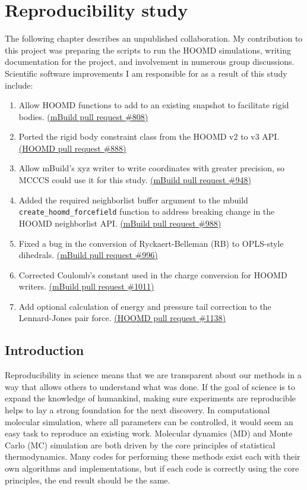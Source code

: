 \chapter{Reproducibility study}
\label{chap:reproducibility}

The following chapter describes an unpublished collaboration.
My contribution to this project was preparing the scripts to run the HOOMD simulations, writing documentation for the project, and involvement in numerous group discussions. 
Scientific software improvements I am responsible for as a result of this study include:
\begin{enumerate}
    \item Allow HOOMD functions to add to an existing snapshot to facilitate rigid bodies. \href{https://github.com/mosdef-hub/mbuild/pull/808}{(mBuild pull request \#808)}
    \item Ported the rigid body constraint class from the HOOMD v2 to v3 API. \href{https://github.com/glotzerlab/hoomd-blue/pull/888}{(HOOMD pull request \#888)}
    \item Allow mBuild's xyz writer to write coordinates with greater precision, so MCCCS could use it for this study. \href{https://github.com/mosdef-hub/mbuild/pull/996}{(mBuild pull request \#948)}
    \item Added the required neighborlist buffer argument to the mbuild \lstinline{create_hoomd_forcefield} function to address breaking change in the HOOMD neighborlist API. \href{https://github.com/mosdef-hub/mbuild/pull/988}{(mBuild pull request \#988)}
    \item Fixed a bug in the conversion of Ryckaert-Belleman (RB) to OPLS-style dihedrals. \href{https://github.com/mosdef-hub/mbuild/pull/996}{(mBuild pull request \#996)}
    \item Corrected Coulomb's constant used in the charge conversion for HOOMD writers. \href{https://github.com/mosdef-hub/mbuild/pull/1011}{(mBuild pull request \#1011)}
    \item Add optional calculation of energy and pressure tail correction to the Lennard-Jones pair force. \href{https://github.com/glotzerlab/hoomd-blue/pull/1138}{(HOOMD pull request \#1138)}
\end{enumerate}

\section{Introduction}
Reproducibility in science means that we are transparent about our methods in a way that allows others to understand what was done.
If the goal of science is to expand the knowledge of humankind, making sure experiments are reproducible helps to lay a strong foundation for the next discovery.
In computational molecular simulation, where all parameters can be controlled, it would seem an easy task to reproduce an existing work.
Molecular dynamics (MD) and Monte Carlo (MC) simulation are both driven by the core principles of statistical thermodynamics.
Many codes for performing these methods exist each with their own algorithms and implementations, but if each code is correctly using the core principles, the end result should be the same.

